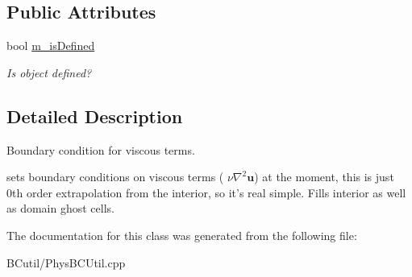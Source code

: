 \subsection*{Public Attributes}
\begin{DoxyCompactItemize}
\item 
\hypertarget{class_viscous_b_c_function_a80aa57390f5a1586c6877c6da8c50e2a}{bool \hyperlink{class_viscous_b_c_function_a80aa57390f5a1586c6877c6da8c50e2a}{m\-\_\-is\-Defined}}\label{class_viscous_b_c_function_a80aa57390f5a1586c6877c6da8c50e2a}

\begin{DoxyCompactList}\small\item\em Is object defined? \end{DoxyCompactList}\end{DoxyCompactItemize}


\subsection{Detailed Description}
Boundary condition for viscous terms. 

sets boundary conditions on viscous terms ( $ \nu \nabla^2 \mathbf{u} $) at the moment, this is just 0th order extrapolation from the interior, so it's real simple. Fills interior as well as domain ghost cells. 

The documentation for this class was generated from the following file\-:\begin{DoxyCompactItemize}
\item 
B\-Cutil/Phys\-B\-C\-Util.\-cpp\end{DoxyCompactItemize}
